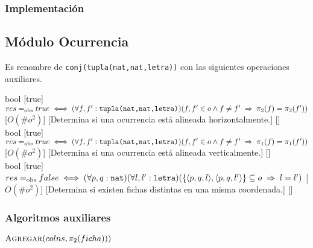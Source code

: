 \subsubsection{Implementación}

\subsection{Módulo Ocurrencia}
Es renombre de \texttt{conj(tupla(nat,nat,letra))} con las siguientes operaciones auxiliares.\\
\begin{adjustwidth}{3em}{0em}
\begin{operaciones}
  {
  }{bool}
  [true]
  {$res\igobs true\iff(\forall f,f':\texttt{tupla(nat,nat,letra)})(f,f'\in o\land f\neq f'\implies \pi_{2}(f)=\pi_{2}(f'))$}
  [$O(\#o^{2})$]
  [Determina si una ocurrencia está alineada horizontalmente.]
  [\falta]\\

  \noindent{}
  {
  }{bool}
  [true]
  {$res\igobs true\iff(\forall f,f':\texttt{tupla(nat,nat,letra)})(f,f'\in o\land f\neq f'\implies \pi_{1}(f)=\pi_{1}(f'))$}
  [$O(\#o^{2})$]
  [Determina si una ocurrencia está alineada verticalmente.]
  [\falta]\\

  \noindent{}
  {
  }{bool}
  [true]
  {$res\igobs false\iff
      (\forall p,q:\texttt{nat})(\forall l,l':\texttt{letra})(
      \{\langle p,q,l\rangle,\langle p,q,l'\rangle\}\subseteq o\implies l=l')$}
  [$O(\#o^{2})$]
  [Determina si existen fichas distintas en una misma coordenada.]
  [\falta]
\end{operaciones}
\end{adjustwidth}

\subsubsection{Algoritmos auxiliares}
\begin{algorithm}[H]
  \begin{algorithmic}[1]
    \State{}
      \State{}
      \State$\textsc{Agregar}(colns,\pi_{2}(ficha)))$
    \EndFor
    \State{}
  \end{algorithmic}
\end{algorithm}

